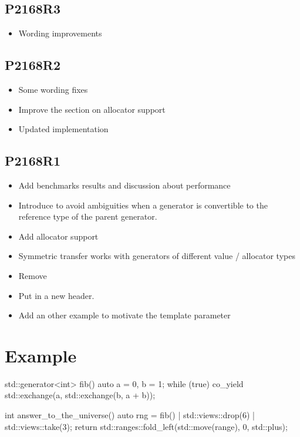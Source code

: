 \documentclass{wg21}
\begin{document}
\subsection{P2168R3}
\begin{itemize}
\item Wording improvements
\end{itemize}

\subsection{P2168R2}
\begin{itemize}
\item Some wording fixes
\item Improve the section on allocator support
\item Updated implementation
\end{itemize}

\subsection{P2168R1}
\begin{itemize}
\item Add benchmarks results and discussion about performance
\item Introduce  to avoid ambiguities when a generator is convertible to the reference type of the parent generator.
\item Add allocator support
\item Symmetric transfer works with generators of different value / allocator types
\item Remove 
\item Put  in a new  header.
\item Add an other example to motivate the  template parameter
\end{itemize}


\section{Example}

\begin{colorblock}
    std::generator<int> fib() {
        auto a = 0, b = 1;
        while (true) {
            co_yield std::exchange(a, std::exchange(b, a + b));
        }
    }

    int answer_to_the_universe() {
        auto rng = fib() | std::views::drop(6) | std::views::take(3);
        return std::ranges::fold_left(std::move(range), 0, std::plus{});
    }
\end{colorblock}
\end{document}
